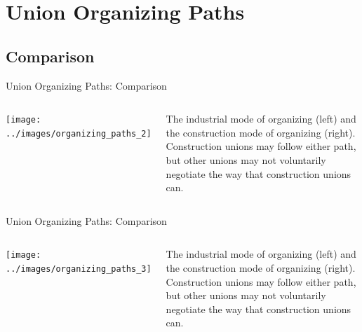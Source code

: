 \documentclass{beamer}
\begin{document}
\section*{Union Organizing Paths}
%    
%    
%

\subsection*{Comparison}

\begin{frame}{Union Organizing Paths: Comparison} %
  \begin{columns}
    \texttt{[image: ../images/organizing\_paths\_2]}

    The industrial mode of organizing (left) and the construction mode of organizing (right).\newline\newline
    Construction unions may follow either path, but other unions may not voluntarily negotiate the way that construction unions can.
    \end{columns}
\end{frame}

\begin{frame}{Union Organizing Paths: Comparison} %
  \begin{columns}
    \texttt{[image: ../images/organizing\_paths\_3]}

    The industrial mode of organizing (left) and the construction mode of organizing (right).\newline\newline
    Construction unions may follow either path, but other unions may not voluntarily negotiate the way that construction unions can.
    \end{columns}
\end{frame}
\end{document}
